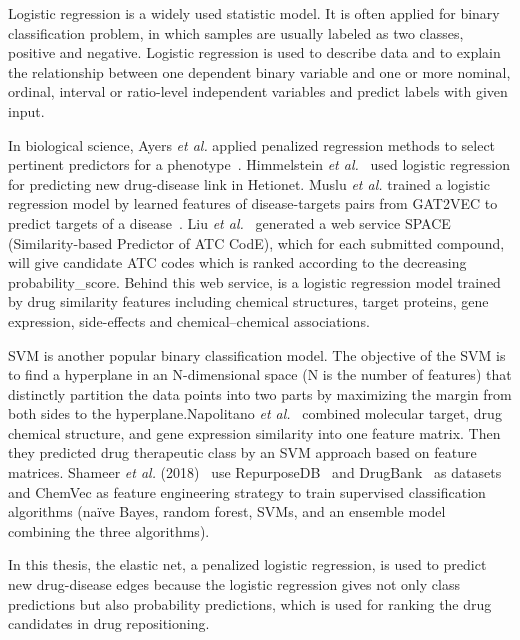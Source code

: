 Logistic regression is a widely used statistic model. It is often applied for binary classification problem, in which samples are usually labeled as two classes, positive and negative. Logistic regression is used to describe data and to explain the relationship between one dependent binary variable and one or more nominal, ordinal, interval or ratio-level independent variables and predict labels with given input.

In biological science, Ayers \textit{et al.} applied penalized regression methods to select pertinent predictors for a phenotype~\cite{ayers_snp_2010}. Himmelstein \textit{et al.}~\cite{himmelstein_systematic_2017} used logistic regression for predicting new drug-disease link in Hetionet. Muslu \textit{et al.} trained a logistic regression model by learned features of disease-targets pairs from GAT2VEC to predict targets of a disease~\cite{alaimo_recommendation_2016}. Liu \textit{et al.}~\cite{liu_similarity-based_2015} generated a web service SPACE (Similarity-based Predictor of ATC CodE), which for each submitted compound, will give candidate ATC codes which is ranked according to the decreasing probability\_score. Behind this web service, is a logistic regression model trained by drug similarity features including chemical structures, target proteins, gene expression, side-effects and chemical–chemical associations.

\ac{SVM} is another popular binary classification model. The objective of the \ac{SVM} is to find a hyperplane in an N-dimensional space (N is the number of features) that distinctly partition the data points into two parts by maximizing the margin from both sides to the hyperplane.Napolitano \textit{et al.}~\cite{napolitano_drug_2013} combined molecular target, drug chemical structure, and gene expression similarity into one feature matrix. Then they predicted drug therapeutic class by an \ac{SVM} approach based on feature matrices. Shameer \textit{et al.} (2018)~\cite{shameer_prioritizing_2018} use RepurposeDB~\cite{shameer_systematic_2018} and DrugBank~\cite{wishart_drugbank_2018} as datasets and ChemVec as feature engineering strategy to train supervised classification algorithms (naïve Bayes, random forest, \ac{SVM}s, and an ensemble model combining the three algorithms).

In this thesis, the elastic net, a penalized logistic regression, is used to predict new drug-disease edges because the logistic regression gives not only class predictions but also probability predictions, which is used for ranking the drug candidates in drug repositioning.

